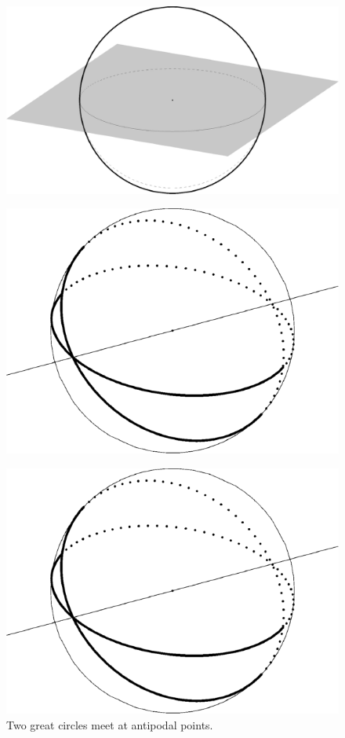 \ifsmallfigs
\begin{figure}
	\centering
	\begin{minipage}{.5\textwidth}
		\centering
	\includegraphics[height=.58\linewidth]{figs/sph-1pl.pdf}
		\label{fig:test1}
	\end{minipage}%
	\begin{minipage}{.5\textwidth}
		\centering
	\includegraphics[height=.58\linewidth]{figs/2gc.pdf}
	\label{fig:sphereline}
	\end{minipage}
\end{figure}
\fi


\ifsmallfigs
\else
\begin{figure}[htb]
	\centering
	\includegraphics[width=.35\textwidth]{figs/2gc.pdf}
	\caption{Two great circles meet at antipodal points.}
	\label{fig:2gc}
\end{figure}
\fi



